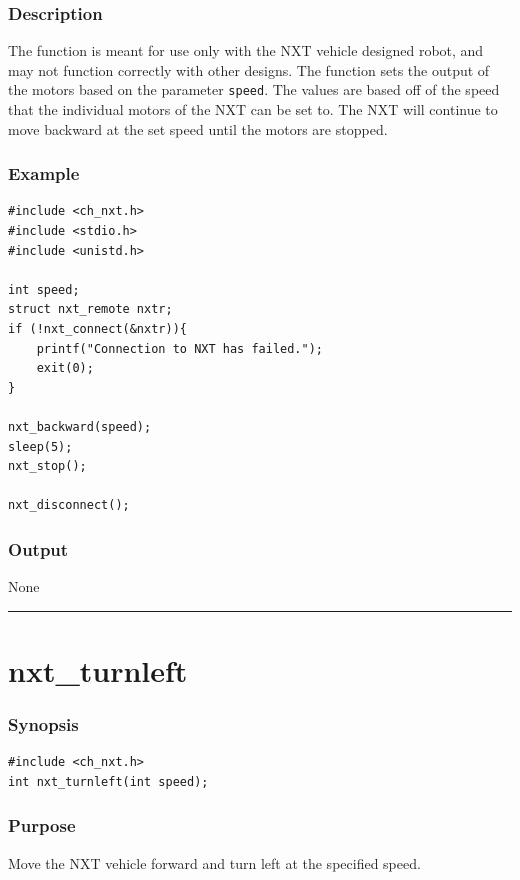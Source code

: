 \documentclass[12pt]{article}
\begin{document}
\subsubsection*{Description}
The function is meant for use only with the NXT vehicle designed robot, 
and may not function correctly with other designs. The function sets the 
output of the motors based on the parameter \verb+speed+. The values are 
based off of the speed that the individual motors of the NXT can be set to. 
The NXT will continue to move backward at the set speed until the motors 
are stopped.

\subsubsection*{Example}
\begin{verbatim}
#include <ch_nxt.h> 
#include <stdio.h>
#include <unistd.h>

int speed;
struct nxt_remote nxtr;
if (!nxt_connect(&nxtr)){
    printf("Connection to NXT has failed.");
    exit(0);
}

nxt_backward(speed);
sleep(5);
nxt_stop();
    
nxt_disconnect();
\end{verbatim}

\subsubsection*{Output}
None 
\\

\hrule
\newpage

\section*{nxt\_turnleft}

\subsubsection*{Synopsis}
\begin{verbatim}
#include <ch_nxt.h>
int nxt_turnleft(int speed);
\end{verbatim}

\subsubsection*{Purpose}
Move the NXT vehicle forward and turn left at the specified speed.
\end{document}
